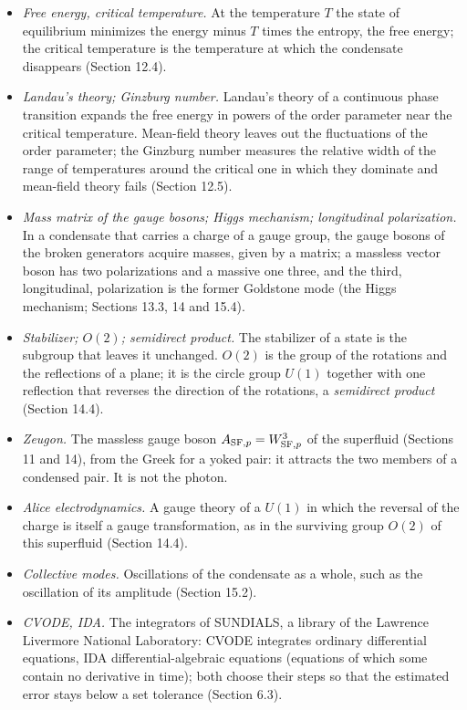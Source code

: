 \documentclass[
  10pt,
]{article}
\begin{document}
\begin{itemize}
  \emph{Effective couplings.} The coefficients with which the energy of
  a method contains each channel of the interaction (Section 9.4).
\item
  \emph{Free energy, critical temperature.} At the temperature \(T\) the
  state of equilibrium minimizes the energy minus \(T\) times the
  entropy, the free energy; the critical temperature is the temperature
  at which the condensate disappears (Section 12.4).
\item
  \emph{Landau's theory; Ginzburg number.} Landau's theory of a
  continuous phase transition expands the free energy in powers of the
  order parameter near the critical temperature. Mean-field theory
  leaves out the fluctuations of the order parameter; the Ginzburg
  number measures the relative width of the range of temperatures around
  the critical one in which they dominate and mean-field theory fails
  (Section 12.5).
\item
  \emph{Mass matrix of the gauge bosons; Higgs mechanism; longitudinal
  polarization.} In a condensate that carries a charge of a gauge group,
  the gauge bosons of the broken generators acquire masses, given by a
  matrix; a massless vector boson has two polarizations and a massive
  one three, and the third, longitudinal, polarization is the former
  Goldstone mode (the Higgs mechanism; Sections 13.3, 14 and 15.4).
\item
  \emph{Stabilizer; \(O(2)\); semidirect product.} The stabilizer of a
  state is the subgroup that leaves it unchanged. \(O(2)\) is the group
  of the rotations and the reflections of a plane; it is the circle
  group \(U(1)\) together with one reflection that reverses the
  direction of the rotations, a \emph{semidirect product} (Section
  14.4).
\item
  \emph{Zeugon.} The massless gauge boson
  \(A_{{\rm SF},p}=W^3_{{\rm SF},p}\) of the superfluid (Sections 11 and
  14), from the Greek for a yoked pair: it attracts the two members of a
  condensed pair. It is not the photon.
\item
  \emph{Alice electrodynamics.} A gauge theory of a \(U(1)\) in which
  the reversal of the charge is itself a gauge transformation, as in the
  surviving group \(O(2)\) of this superfluid (Section 14.4).
\item
  \emph{Collective modes.} Oscillations of the condensate as a whole,
  such as the oscillation of its amplitude (Section 15.2).
\item
  \emph{CVODE, IDA.} The integrators of SUNDIALS, a library of the
  Lawrence Livermore National Laboratory: CVODE integrates ordinary
  differential equations, IDA differential-algebraic equations
  (equations of which some contain no derivative in time); both choose
  their steps so that the estimated error stays below a set tolerance
  (Section 6.3).
\end{itemize}
\end{document}
